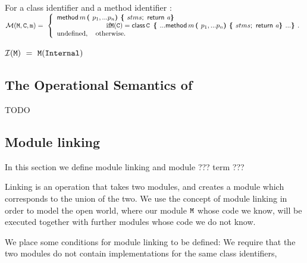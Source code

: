   
 \begin{definition}[Lookup]For a class identifier   and a method identifier  : $ ~ $ \\

\noindent
$
{\mathcal M}({{\mbox{\tt{M}}}{{{\mbox{\tt{}}}}}},{\mbox{\tt{{\mbox{\tt{C}}}}}}, {\mbox{\tt{m}}})      =  \ \left\{  
\begin{array}{l}
                          {\bf{\sf {method}}}\, m\, \mbox{\tt{\bf{( }}} p_1, ... p_n \mbox{\tt{\bf{) }}} \mbox{\tt{\bf{\{ }}} stms \mbox{{{\bf{\sf {;}}}}\ }\, {\bf{\sf {return}}}\ {{\mbox{\tt{{\it a}}}}} \mbox{\tt{\bf{\} }}}\\
\hspace{1in} \mbox{if}  {\mbox{\tt{M}}}({\mbox{\tt{C}}}) =   
{\bf{\sf {class}}}\, {\mbox{\tt{C}}}\, \  \mbox{\tt{\bf{\{ }}} ...   {\bf{\sf {method}}}\, m\, \mbox{\tt{\bf{( }}} p_1, ... p_n \mbox{\tt{\bf{) }}} \mbox{\tt{\bf{\{ }}} stms \mbox{{{\bf{\sf {;}}}}\ }\, {\bf{\sf {return}}}\ {{\mbox{\tt{{\it a}}}}} \mbox{\tt{\bf{\} }}}  ... \mbox{\tt{\bf{\} }}}.  
\\
\mbox{undefined},  \ \ \ \mbox{otherwise.}
\end{array}
                    \right.$
 
${\mathcal{ I}} ( {{\mbox{\tt{M}}}} ) \    =  \     {\mbox{\tt{M}}}({\mbox{\tt{Internal}}} )$
\\

 
  \end{definition}

\subsection{The Operational Semantics of \LangOO}
\label{formal:semantics}

TODO

\subsection{Module linking}

 In this section we define  module linking and module ??? term ???
 
 Linking is an operation that takes two modules, and creates a module which corresponds  to the union of the two. We use the concept of module linking in order to model the open world, where our module ${\mbox{\tt{M}}}$ whose code we know, will be executed together with further modules whose code we do not know. 

We place some conditions for module linking to be defined: We require that the two modules do not contain implementations for the same class identifiers,  

